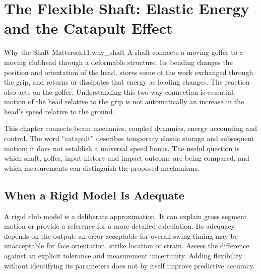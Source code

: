 \chapter{The Flexible Shaft: Elastic Energy and the Catapult Effect}
\label{ch:flexible_shaft}
\raggedbottom
{}

\begin{laymansbox}{Why the Shaft Matters}{ch11:why_shaft}
A shaft connects a moving golfer to a moving clubhead through a deformable structure. Its bending changes the position and orientation of the head, stores some of the work exchanged through the grip, and returns or dissipates that energy as loading changes. The reaction also acts on the golfer. Understanding this two-way connection is essential: motion of the head relative to the grip is not automatically an increase in the head's speed relative to the ground.

This chapter connects beam mechanics, coupled dynamics, energy accounting and control. The word ``catapult'' describes temporary elastic storage and subsequent motion; it does not establish a universal speed bonus. The useful question is which shaft, golfer, input history and impact outcome are being compared, and which measurements can distinguish the proposed mechanisms.
\end{laymansbox}

\section{When a Rigid Model Is Adequate}
A rigid club model is a deliberate approximation. It can explain gross segment motion or provide a reference for a more detailed calculation. Its adequacy depends on the output: an error acceptable for overall swing timing may be unacceptable for face orientation, strike location or strain. Assess the difference against an explicit tolerance and measurement uncertainty. Adding flexibility without identifying its parameters does not by itself improve predictive accuracy.


